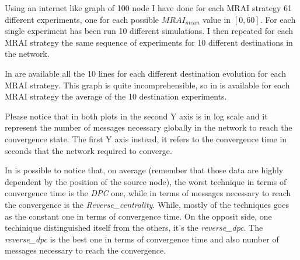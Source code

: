 \documentclass[10pt,conference,letterpaper]{IEEEtran}
\begin{document}
Using an internet like graph of \num{100} node I have done for each \ac{MRAI}
strategy \ac{61} different experiments, one for each possible $MRAI_{mean}$
value in $[0, 60]$. For each single experiment has been run 10 different simulations.
I then repeated for each \ac{MRAI} strategy the same sequence of experiments for 
\num{10} different destinations in the network.

In  are available all the \num{10} lines
for each different destination evolution for each \ac{MRAI} strategy.
This graph is quite incomprehensible, so in 
is available for each \ac{MRAI} strategy the average of the \num{10} destination
experiments.

Please notice that in both plots in  the 
second Y axis is in log scale and it represent the number of messages necessary
globally in the network to reach the convergence state.
The first Y axis instead, it refers to the convergence time in seconds that
the network required to converge.

In  is possible to notice that, on average
(remember that those data are highly dependent by the position of the source node),
the worst technique in terms of convergence time is the \textit{DPC} one, while in terms of
messages necessary to reach the convergence is the \textit{Reverse\_centrality}.
While, mostly of the techniques goes as the constant one in terms of convergence time.
On the opposit side, one techinique distinguished itself from the others, it's the 
\textit{reverse\_dpc}.
The \textit{reverse\_dpc} is the best one in terms of convergence time and also
number of messages necessary to reach the convergence.
\end{document}
